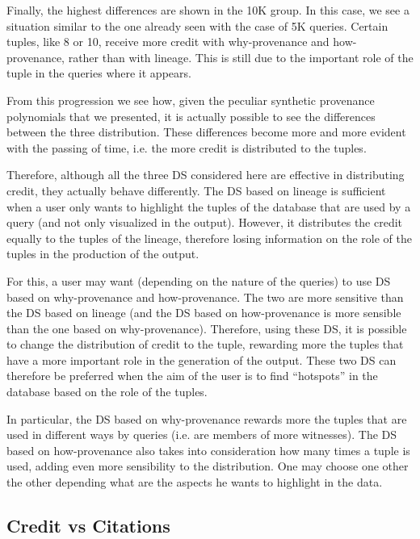 Finally, the highest differences are shown in the 10K group. In this case, we see a situation similar to the one already seen with the case of 5K queries. Certain tuples, like 8 or 10, receive more credit with why-provenance and how-provenance, rather than with lineage. This is still due to the important role of the tuple in the queries where it appears. 

From this progression we see how, given the peculiar synthetic provenance polynomials that we presented, it is actually possible to see the differences between the three distribution. These differences become more and more evident with the passing of time, i.e. the more credit is distributed to the tuples. 

Therefore, although all the three DS considered here are effective in distributing credit, they actually behave differently. 
The DS based on lineage is sufficient when a user only wants to highlight the tuples of the database that are used by a query (and not only visualized in the output). However, it distributes the credit equally to the tuples of the lineage, therefore losing information on the role of the tuples in the production of the output. 

For this, a user may want (depending on the nature of the queries) to use DS based on why-provenance and how-provenance. The two are more sensitive than the DS based on lineage (and the DS based on how-provenance is more sensible than the one based on why-provenance). 
Therefore, using these DS, it is possible to change the distribution of credit to the tuple, rewarding more the tuples that have a more important role in the generation of the output. These two DS can therefore be preferred when the aim of the user is to find ``hotspots'' in the database based on the role of the tuples. 

In particular, the DS based on why-provenance rewards more the tuples that are used in different ways by queries (i.e. are members of more witnesses). The DS based on how-provenance also takes into consideration how many times a tuple is used, adding even more sensibility to the distribution. 
One may choose one other the other depending what are the aspects he wants to highlight in the data.


\subsection{Credit vs Citations}

